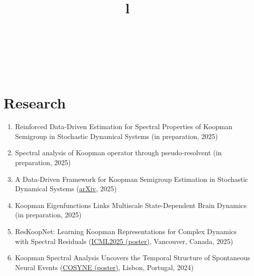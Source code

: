 \documentclass[margin]{res}
\begin{document}
\begin{resume}




\begin{format}
\title{l}\\
\\
\body\\
\end{format}


\section{Research}

\begin{enumerate}
    \item Reinforced Data-Driven Estimation for Spectral Properties of Koopman Semigroup in Stochastic Dynamical Systems (in preparation, 2025)
    
    \item Spectral analysis of Koopman operator through pseudo-resolvent (in preparation, 2025)
    
    \item A Data-Driven Framework for Koopman Semigroup Estimation in Stochastic Dynamical Systems (\href{https://arxiv.org/abs/2501.13301}{arXiv}, 2025) 

    \item Koopman Eigenfunctions Links Multiscale State-Dependent Brain Dynamics (in preparation, 2025)

    \item ResKoopNet: Learning Koopman Representations for Complex Dynamics with Spectral Residuals (\href{https://icml.cc/virtual/2025/poster/45196}{ICML2025 (poster)}, Vancouver, Canada, 2025)

    \item  Koopman Spectral Analysis Uncovers the Temporal Structure of Spontaneous Neural Events (\href{https://static1.squarespace.com/static/6102ca347474c263c40150cd/t/65e1abbdf843e41837fc9c0d/1709288389623/Cosyne2024_program_book.pdf}{COSYNE (poster)}, Lisbon, Portugal, 2024)


\end{enumerate}
\end{resume}
\end{document}
